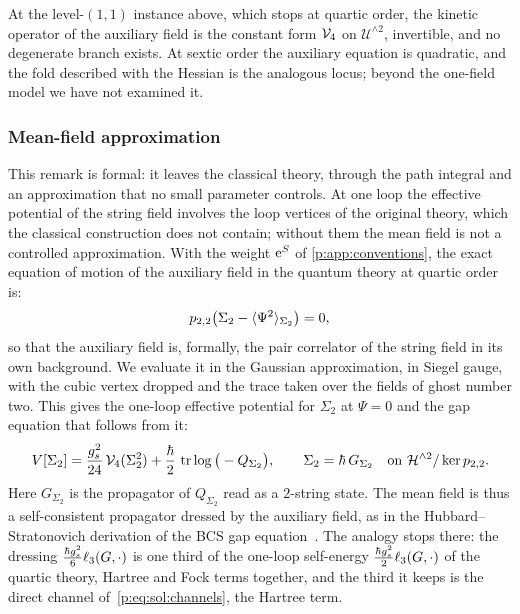 At the level-$(1, 1)$ instance above, which stops at quartic order, the kinetic operator of the auxiliary field is the constant form $\mathcal{V}_{4}$ on $\mathcal U^{\wedge 2}$, invertible, and no degenerate branch exists.
At sextic order the auxiliary equation is quadratic, and the fold described with the Hessian is the analogous locus; beyond the one-field model we have not examined it.

\subsubsection{Mean-field approximation}
\label{p:sec:sol:mean-field}


This remark is formal: it leaves the classical theory, through the path integral and an approximation that no small parameter controls.
At one loop the effective potential of the string field involves the loop vertices of the original theory, which the classical construction does not contain; without them the mean field is not a controlled approximation.
With the weight $\mathrm{e}^{S}$ of \cref{p:app:conventions}, the exact equation of motion of the auxiliary field in the quantum theory at quartic order is:
\begin{equation}
  \label{p:eq:sol:quantum-auxiliary}
  p_{2,2}\big( \Sigma_2 - \langle \Psi^2 \rangle_{\Sigma_2} \big)
    = 0,
\end{equation}
so that the auxiliary field is, formally, the pair correlator of the string field in its own background.
We evaluate it in the Gaussian approximation, in Siegel gauge, with the cubic vertex dropped and the trace taken over the fields of ghost number two.
This gives the one-loop effective potential for $\Sigma_2$ at $\Psi = 0$ and the gap equation that follows from it:
\begin{equation}
  \label{p:eq:sol:gap}
  V[\Sigma_2]
    = \frac{g_s^2}{24} \, \mathcal{V}_{4}(\Sigma_2^2)
      + \frac{\hbar}{2} \, \operatorname{tr} \log \big( - Q_{\Sigma_2} \big),
  \qquad
  \Sigma_2
    = \hbar \, G_{\Sigma_2}
  \quad \text{on } \mathcal{H}^{\wedge 2} / \ker p_{2,2}.
\end{equation}
Here $G_{\Sigma_2}$ is the propagator of $Q_{\Sigma_2}$ read as a $2$-string state.
The mean field is thus a self-consistent propagator dressed by the auxiliary field, as in the Hubbard--Stratonovich derivation of the BCS gap equation~\cite{Weinberg:2005:QuantumTheoryFields-2,Negele:1988:QuantumManyParticleSystems}.
The analogy stops there: the dressing $\tfrac{\hbar g_s^2}{6} \ell_3(G, \cdot)$ is one third of the one-loop self-energy $\tfrac{\hbar g_s^2}{2} \ell_3(G, \cdot)$ of the quartic theory, Hartree and Fock terms together, and the third it keeps is the direct channel of~\eqref{p:eq:sol:channels}, the Hartree term.
